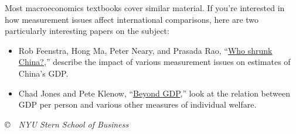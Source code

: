 \documentclass[12pt,letterpaper]{article}
\begin{document}
Most macroeconomics textbooks cover similar material.
If you're interested in how measurement issues affect
international comparisons, here are two
particularly interesting papers on the subject:
%
\begin{itemize}
\item Rob Feenstra, Hong Ma, Peter Neary, and Prasada Rao,
``\href{http://papers.nber.org/papers/w17729}{Who shrunk China?},''
describe the impact of various measurement issues on
estimates of China's GDP.

\item Chad Jones and Pete Klenow,
``\href{http://klenow.com/Jones_Klenow.pdf}{Beyond GDP},''
look at the relation between GDP per person and
various other measures of individual welfare.

\end{itemize}

\vfill \centerline{\it \copyright \ \number\year \ NYU Stern
School of Business}
\end{document}
